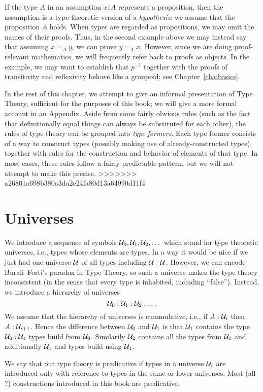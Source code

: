 {If the type $A$ in an assumption $x:A$ represents a proposition, then the assumption is a type-theoretic version of a \emph{hypothesis}: we assume that the proposition $A$ holds.
When types are regarded as propositions, we may omit the names of their proofs.
Thus, in the second example above we may instead say that assuming $x =_A y$, we can prove $y =_A x$.
However, since we are doing proof-relevant mathematics, we will frequently refer back to proofs as objects.
In the example, we may want to establish that $p^{-1}$ together with the proofs of transitivity and reflexivity behave like a groupoid; see Chapter~\ref{cha:basics}.

In the rest of this chapter, we attempt to give an informal presentation of Type Theory, sufficient for the purposes of this book; we will give a more formal account in an Appendix.
Aside from some fairly obvious rules (such as the fact that definitionally equal things can always be substituted for each other), the rules of type theory can be grouped into \emph{type formers}.
Each type former consists of a way to construct types (possibly making use of already-constructed types), together with rules for the construction and behavior of elements of that type.
In most cases, these rules follow a fairly predictable pattern, but we will not attempt to make this precise.
>>>>>>> a26801a698b380a3da2e24fa80d13a64990d11f4


\section{Universes}
\label{sec:universes}

We introduce a sequence of symbols ${\mathcal U}_0,{\mathcal U}_1,{\mathcal U}_2, \dots$ which
stand for type theoretic universes, i.e., types whose elements are
types. In a way it would be nice if we just had one universe ${\mathcal U}$ of
all types including ${\mathcal U} : {\mathcal U}$.
However, we can encode Burali--Forti's paradox in Type Theory, so such a universe makes the type theory inconsistent (in the sense that every type is inhabited, including ``false'').
Instead, we introduce a hierarchy of universes
\[ {\mathcal U}_0 : {\mathcal U}_1 : {\mathcal U}_2 : \dots \]
We assume that the hierarchy of universes is cummulative, i.e., if
$A:{\mathcal U}_i$ then $A : {\mathcal U}_{i+1}$. Hence the difference between
${\mathcal U}_0$ and ${\mathcal U}_1$ is that ${\mathcal U}_1$ contains the type ${\mathcal U}_0:{\mathcal U}_1$
types build from ${\mathcal U}_0$. Similarily ${\mathcal U}_2$ contains all the types
from ${\mathcal U}_1$ and additionally ${\mathcal U}_1$ and types build using ${\mathcal U}_1$. 

We say that our type theory is predicative if types in a universe
${\mathcal U}_i$ are introduced only with reference to types in the same or
lower universes. Most (all ?) constructions introduced in this book
are predicative. 

}
